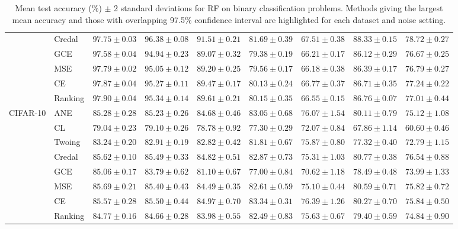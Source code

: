 \documentclass[letterpaper]{article} %
\begin{document}
\begin{table}[t]
\begin{tabular}{clccccccc}
 & Credal & $97.75 \pm 0.03$ & $\mathbf{96.38 \pm 0.08}$ & $\mathbf{91.51 \pm 0.21}$ & $81.69 \pm 0.39$ & $67.51 \pm 0.38$ & $\mathbf{88.33 \pm 0.15}$ & $\mathbf{78.72 \pm 0.27}$ \\ 
 & GCE    & $97.58 \pm 0.04$ & $94.94 \pm 0.23$ & $89.07 \pm 0.32$ & $79.38 \pm 0.19$ & $66.21 \pm 0.17$ & $86.12 \pm 0.29$ & $76.67 \pm 0.25$ \\ 
 & MSE    & $97.79 \pm 0.02$ & $95.05 \pm 0.12$ & $89.20 \pm 0.25$ & $79.56 \pm 0.17$ & $66.18 \pm 0.38$ & $86.39 \pm 0.17$ & $76.79 \pm 0.27$ \\ 
 & CE     & $\mathbf{97.87 \pm 0.04}$ & $95.27 \pm 0.11$ & $89.47 \pm 0.17$ & $80.13 \pm 0.24$ & $66.77 \pm 0.37$ & $86.71 \pm 0.35$ & $\mathbf{77.24 \pm 0.22}$ \\ 
 & Ranking & $\mathbf{97.90 \pm 0.04}$ & $95.34 \pm 0.14$ & $89.61 \pm 0.21$ & $80.15 \pm 0.35$ & $66.55 \pm 0.15$ & $86.76 \pm 0.07$ & $\mathbf{77.01 \pm 0.44}$ \\ 
\hline
\multirow{8}{*}{CIFAR-10}
 & ANE    & $85.28 \pm 0.28$ & $\mathbf{85.23 \pm 0.26}$ & $\mathbf{84.68 \pm 0.46}$ & $\mathbf{83.05 \pm 0.68}$ & $\mathbf{76.07 \pm 1.54}$ & $\mathbf{80.11 \pm 0.79}$ & $\mathbf{75.12 \pm 1.08}$ \\ 
 & CL     & $79.04 \pm 0.23$ & $79.10 \pm 0.26$ & $78.78 \pm 0.92$ & $77.30 \pm 0.29$ & $72.07 \pm 0.84$ & $67.86 \pm 1.14$ & $60.60 \pm 0.46$ \\ 
 & Twoing & $83.24 \pm 0.20$ & $82.91 \pm 0.19$ & $82.82 \pm 0.42$ & $81.81 \pm 0.67$ & $\mathbf{75.87 \pm 0.80}$ & $77.32 \pm 0.40$ & $72.79 \pm 1.15$ \\ 
 & Credal & $\mathbf{85.62 \pm 0.10}$ & $\mathbf{85.49 \pm 0.33}$ & $\mathbf{84.82 \pm 0.51}$ & $\mathbf{82.87 \pm 0.73}$ & $\mathbf{75.31 \pm 1.03}$ & $\mathbf{80.77 \pm 0.38}$ & $\mathbf{76.54 \pm 0.88}$ \\ 
 & GCE    & $85.06 \pm 0.17$ & $83.79 \pm 0.62$ & $81.10 \pm 0.67$ & $77.00 \pm 0.84$ & $70.62 \pm 1.18$ & $78.49 \pm 0.48$ & $73.99 \pm 1.33$ \\ 
 & MSE    & $\mathbf{85.69 \pm 0.21}$ & $\mathbf{85.40 \pm 0.43}$ & $\mathbf{84.49 \pm 0.35}$ & $82.61 \pm 0.59$ & $\mathbf{75.10 \pm 0.44}$ & $\mathbf{80.59 \pm 0.71}$ & $\mathbf{75.82 \pm 0.72}$ \\ 
 & CE     & $\mathbf{85.57 \pm 0.28}$ & $\mathbf{85.50 \pm 0.44}$ & $\mathbf{84.97 \pm 0.70}$ & $\mathbf{83.34 \pm 0.31}$ & $\mathbf{76.39 \pm 1.26}$ & $\mathbf{80.27 \pm 0.70}$ & $\mathbf{75.84 \pm 0.50}$ \\ 
 & Ranking & $84.77 \pm 0.16$ & $84.66 \pm 0.28$ & $83.98 \pm 0.55$ & $\mathbf{82.49 \pm 0.83}$ & $\mathbf{75.63 \pm 0.67}$ & $79.40 \pm 0.59$ & $74.84 \pm 0.90$ \\ 
\hline
\end{tabular} 
\caption{Mean test accuracy (\%) $\pm$ 2 standard deviations for RF on binary classification problems. Methods giving the largest mean accuracy and those with overlapping 97.5\% confidence interval are highlighted for each dataset and noise setting.} 
\label{tab:rf-bin}
\end{table} 
\end{document}
